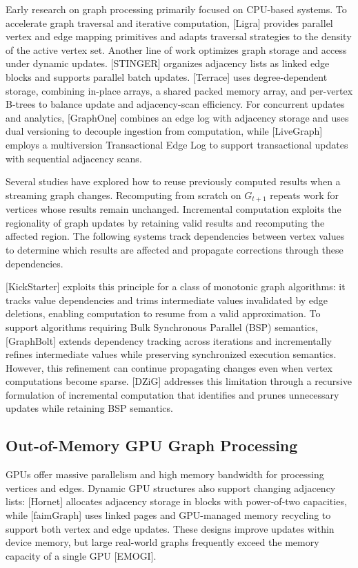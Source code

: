 Early research on graph processing primarily focused on CPU-based systems. To accelerate graph traversal and iterative computation, [Ligra] provides parallel vertex and edge mapping primitives and adapts traversal strategies to the density of the active vertex set. Another line of work optimizes graph storage and access under dynamic updates. [STINGER] organizes adjacency lists as linked edge blocks and supports parallel batch updates. [Terrace] uses degree-dependent storage, combining in-place arrays, a shared packed memory array, and per-vertex B-trees to balance update and adjacency-scan efficiency. For concurrent updates and analytics, [GraphOne] combines an edge log with adjacency storage and uses dual versioning to decouple ingestion from computation, while [LiveGraph] employs a multiversion Transactional Edge Log to support transactional updates with sequential adjacency scans.

Several studies have explored how to reuse previously computed results when a streaming graph changes. Recomputing from scratch on $G_{t+1}$ repeats work for vertices whose results remain unchanged. Incremental computation exploits the regionality of graph updates by retaining valid results and recomputing the affected region. The following systems track dependencies between vertex values to determine which results are affected and propagate corrections through these dependencies.

[KickStarter] exploits this principle for a class of monotonic graph algorithms: it tracks value dependencies and trims intermediate values invalidated by edge deletions, enabling computation to resume from a valid approximation. To support algorithms requiring Bulk Synchronous Parallel (BSP) semantics, [GraphBolt] extends dependency tracking across iterations and incrementally refines intermediate values while preserving synchronized execution semantics. However, this refinement can continue propagating changes even when vertex computations become sparse. [DZiG] addresses this limitation through a recursive formulation of incremental computation that identifies and prunes unnecessary updates while retaining BSP semantics.

\subsection{Out-of-Memory GPU Graph Processing}

GPUs offer massive parallelism and high memory bandwidth for processing vertices and edges. Dynamic GPU structures also support changing adjacency lists: [Hornet] allocates adjacency storage in blocks with power-of-two capacities, while [faimGraph] uses linked pages and GPU-managed memory recycling to support both vertex and edge updates. These designs improve updates within device memory, but large real-world graphs frequently exceed the memory capacity of a single GPU [EMOGI].

